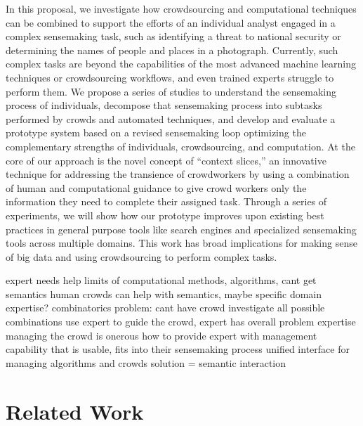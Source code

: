 \documentclass[journal]{vgtc}                %
\begin{document}
In this proposal, we investigate how crowdsourcing and computational techniques can be combined to support the efforts of an individual analyst engaged in a complex sensemaking task, such as identifying a threat to national security or determining the names of people and places in a photograph. Currently, such complex tasks are beyond the capabilities of the most advanced machine learning techniques or crowdsourcing workflows, and even trained experts struggle to perform them. We propose a series of studies to understand the sensemaking process of individuals, decompose that sensemaking process into subtasks performed by crowds and automated techniques, and develop and evaluate a prototype system based on a revised sensemaking loop optimizing the complementary strengths of individuals, crowdsourcing, and computation. At the core of our approach is the novel concept of “context slices,” an innovative technique for addressing the transience of crowdworkers by using a combination of human and computational guidance to give crowd workers only the information they need to complete their assigned task. Through a series of experiments, we will show how our prototype improves upon existing best practices in general purpose tools like search engines and specialized sensemaking tools across multiple domains. This work has broad implications for making sense of big data and using crowdsourcing to perform complex tasks.



expert needs help
limits of computational methods, algorithms, cant get semantics
human crowds can help with semantics, maybe specific domain expertise?
combinatorics problem:  cant have crowd investigate all possible combinations
use expert to guide the crowd, expert has overall problem expertise
managing the crowd is onerous
how to provide expert with management capability that is usable, fits into their sensemaking process
unified interface for managing algorithms and crowds
solution = semantic interaction

\section{Related Work}
\end{document}
